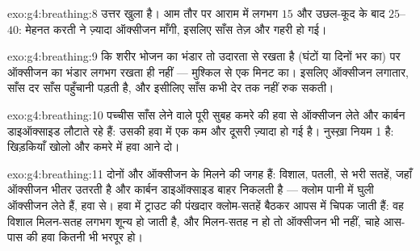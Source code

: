 \begin{solution}{exo:g4:breathing:8}
उत्तर खुला है। आम तौर पर आराम में लगभग $15$ और उछल-कूद के बाद
$25$--$40$: मेहनत करती  ने ज़्यादा ऑक्सीजन माँगी, इसलिए साँस
तेज़ और गहरी हो गई।
\end{solution}

\begin{solution}{exo:g4:breathing:9}
कि शरीर भोजन का भंडार तो उदारता से रखता है (घंटों या दिनों भर का) पर
ऑक्सीजन का भंडार लगभग रखता ही नहीं --- मुश्किल से एक मिनट का। इसलिए
ऑक्सीजन लगातार, साँस दर साँस पहुँचानी पड़ती है, और इसीलिए साँस कभी देर
तक नहीं रुक सकती।
\end{solution}

\begin{solution}{exo:g4:breathing:10}
पच्चीस साँस लेने वाले पूरी सुबह कमरे की हवा से ऑक्सीजन लेते और कार्बन
डाइऑक्साइड लौटाते रहे हैं: उसकी हवा में एक कम और दूसरी ज़्यादा हो गई
है। नुस्ख़ा नियम 1 है: खिड़कियाँ खोलो और कमरे में हवा आने दो।
\end{solution}

\begin{solution}{exo:g4:breathing:11}
दोनों  और ऑक्सीजन के मिलने की जगह हैं: विशाल, पतली,  से भरी
सतहें, जहाँ ऑक्सीजन भीतर उतरती है और कार्बन डाइऑक्साइड बाहर निकलती है
--- क्लोम पानी में घुली ऑक्सीजन लेते हैं,  हवा से। हवा में
ट्राउट की पंखदार क्लोम-सतहें बैठकर आपस में चिपक जाती हैं: वह विशाल
मिलन-सतह लगभग शून्य हो जाती है, और मिलन-सतह न हो तो ऑक्सीजन भी नहीं,
चाहे आस-पास की हवा कितनी भी भरपूर हो।
\end{solution}
